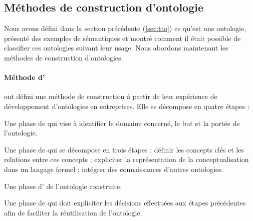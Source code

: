 \subsection{Méthodes de construction d'ontologie}\label{sec:construction}
Nous avons défini dans la section précédente (\ref{sec:tto}) ce qu'est une ontologie, présenté des exemples de sémantiques et montré comment il était possible de classifier ces ontologies suivant leur usage. 
Nous abordons maintenant les méthodes de construction d'ontologies.


\paragraph{Méthode d'\cite{Uschold1996}}
\citeauthor{Uschold1996} ont défini une méthode de construction à partir de leur expérience de développement d'ontologies en entreprises. 
Elle se décompose en quatre étapes :
\begin{listenum}
	\item Une phase de  qui vise à identifier le domaine concerné, le but et la portée de l'ontologie.
	\item Une phase de  qui se décompose en trois étapes ; définir les concepts clés et les relations entre ces concepts ; expliciter la représentation de la conceptualisation dans un langage formel ; intégrer des connaissances d'autres ontologies.
	\item Une phase d' de l'ontologie construite.
	\item Une phase de  qui doit expliciter les décisions effectuées aux étapes précédentes afin de faciliter la réutilisation de l'ontologie.
\end{listenum}



